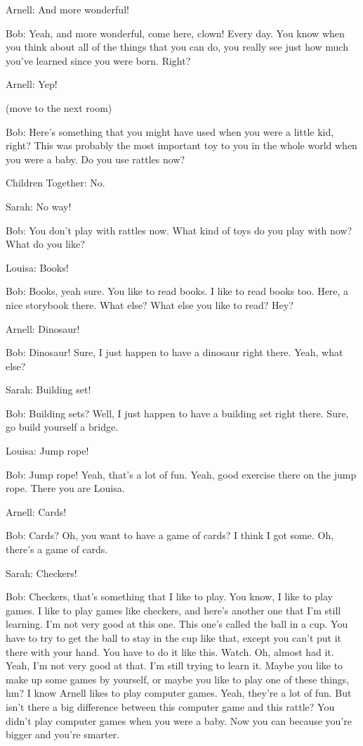 Arnell: And more wonderful!

Bob: Yeah, and more wonderful, come here, clown! Every day. You know when you think about all of the things that you can do, you really see just how much you've learned since you were born. Right?

Arnell: Yep!

(move to the next room)

Bob: Here's something that you might have used when you were a little kid, right? This was probably the most important toy to you in the whole world when you were a baby. Do you use rattles now?

Children Together: No.

Sarah: No way!

Bob: You don't play with rattles now. What kind of toys do you play with now? What do you like?

Louisa: Books!

Bob: Books, yeah sure. You like to read books. I like to read books too. Here, a nice storybook there. What else? What else you like to read? Hey?

Arnell: Dinosaur!

Bob: Dinosaur! Sure, I just happen to have a dinosaur right there. Yeah, what else?

Sarah: Building set!

Bob: Building sets? Well, I just happen to have a building set right there. Sure, go build yourself a bridge.

Louisa: Jump rope!

Bob: Jump rope! Yeah, that's a lot of fun. Yeah, good exercise there on the jump rope. There you are Louisa.

Arnell: Cards!

Bob: Cards? Oh, you want to have a game of cards? I think I got some. Oh, there's a game of cards.

Sarah: Checkers!

Bob: Checkers, that's something that I like to play. You know, I like to play games. I like to play games like checkers, and here's another one that I'm still learning. I'm not very good at this one. This one's called the ball in a cup. You have to try to get the ball to stay in the cup like that, except you can't put it there with your hand. You have to do it like this. Watch. Oh, almost had it. Yeah, I'm not very good at that. I'm still trying to learn it. Maybe you like to make up some games by yourself, or maybe you like to play one of these things, hm? I know Arnell likes to play computer games. Yeah, they're a lot of fun. But isn't there a big difference between this computer game and this rattle? You didn't play computer games when you were a baby. Now you can because you're bigger and you're smarter.

